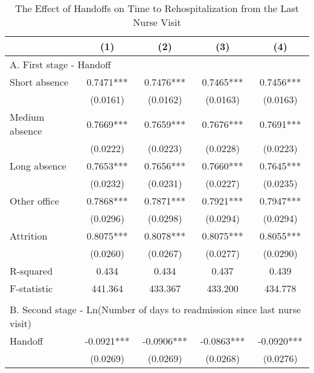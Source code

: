 \documentclass[final,12pt, notitlepage]{article}
\begin{document}
\begin{singlespace}
\begin{table}[H]
\footnotesize
\setlength\tabcolsep{0pt}
\centering
\caption{The Effect of Handoffs on Time to Rehospitalization from the Last Nurse Visit}
\label{tab:days2readmit_iv}
\begin{threeparttable}
{
\def\sym#1{\ifmmode^{#1}\else\(^{#1}\)\fi}
\begin{tabular*}{\textwidth}{l@{\extracolsep{\fill}}*{4}{c}}
\toprule
                    &\multicolumn{1}{c}{(1)}&\multicolumn{1}{c}{(2)}&\multicolumn{1}{c}{(3)}&\multicolumn{1}{c}{(4)}\\
\midrule
\multicolumn{5}{l}{A. First stage - Handoff} \\
Short absence       &      0.7471***&      0.7476***&      0.7465***&      0.7456***\\
                    &    (0.0161)   &    (0.0162)   &    (0.0163)   &    (0.0163)   \\
Medium absence      &      0.7669***&      0.7659***&      0.7676***&      0.7691***\\
                    &    (0.0222)   &    (0.0223)   &    (0.0228)   &    (0.0223)   \\
Long absence        &      0.7653***&      0.7656***&      0.7660***&      0.7645***\\
                    &    (0.0232)   &    (0.0231)   &    (0.0227)   &    (0.0235)   \\
Other office        &      0.7868***&      0.7871***&      0.7921***&      0.7947***\\
                    &    (0.0296)   &    (0.0298)   &    (0.0294)   &    (0.0294)   \\
Attrition           &      0.8075***&      0.8078***&      0.8075***&      0.8055***\\
                    &    (0.0260)   &    (0.0267)   &    (0.0277)   &    (0.0290)   \\
R-squared           &       0.434   &       0.434   &       0.437   &       0.439   \\
F-statistic         &     441.364   &     433.367   &     433.200   &     434.778   \\
\\
\multicolumn{5}{l}{B. Second stage - Ln(Number of days to readmission since last nurse visit)} \\
Handoff             &     -0.0921***&     -0.0906***&     -0.0863***&     -0.0920***\\
                    &    (0.0269)   &    (0.0269)   &    (0.0268)   &    (0.0276)   \\

\end{tabular*}}
\end{threeparttable}
\end{table}
\end{singlespace}
\end{document}
